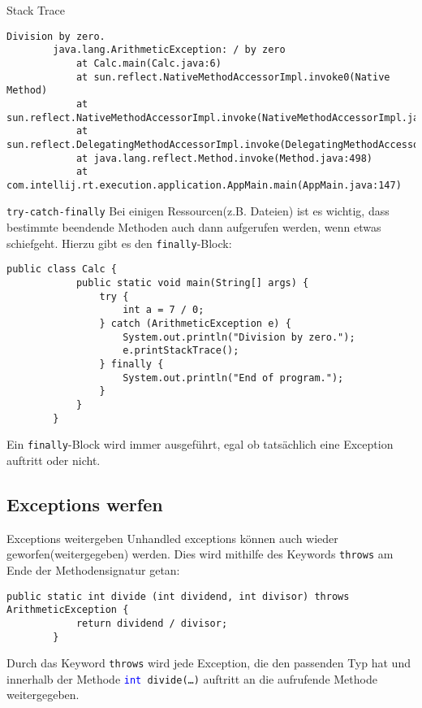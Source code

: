 \begin{frame}[fragile]{Stack Trace}
    \begin{lstlisting}[gobble=8]
        Division by zero.
        java.lang.ArithmeticException: / by zero
            at Calc.main(Calc.java:6)
            at sun.reflect.NativeMethodAccessorImpl.invoke0(Native Method)
            at sun.reflect.NativeMethodAccessorImpl.invoke(NativeMethodAccessorImpl.java:62)
            at sun.reflect.DelegatingMethodAccessorImpl.invoke(DelegatingMethodAccessorImpl.java:43)
            at java.lang.reflect.Method.invoke(Method.java:498)
            at com.intellij.rt.execution.application.AppMain.main(AppMain.java:147)
    \end{lstlisting}
\end{frame}

\begin{frame}[fragile]{\texttt{try-catch-finally}}
    Bei einigen Ressourcen(z.B. Dateien) ist es wichtig, dass bestimmte beendende Methoden auch dann aufgerufen werden, wenn etwas schiefgeht.
    Hierzu gibt es den \texttt{finally}-Block:
    \begin{lstlisting}[gobble=8]
        public class Calc {
            public static void main(String[] args) {
                try {
                    int a = 7 / 0;
                } catch (ArithmeticException e) {
                    System.out.println("Division by zero.");
                    e.printStackTrace();
                } finally {
                    System.out.println("End of program.");
                }
            }
        }
    \end{lstlisting}
    Ein \texttt{finally}-Block wird immer ausgeführt, egal ob tatsächlich eine Exception auftritt oder nicht.
\end{frame}

\subsection{Exceptions werfen}
\begin{frame}[fragile]{Exceptions weitergeben}
    Unhandled exceptions können auch wieder geworfen(weitergegeben) werden.
    Dies wird mithilfe des Keywords \texttt{throws} am Ende der Methodensignatur getan:
    \begin{lstlisting}[gobble=8]
        public static int divide (int dividend, int divisor) throws ArithmeticException {
            return dividend / divisor;
        }
    \end{lstlisting}
    Durch das Keyword \texttt{throws} wird jede Exception, die den passenden Typ hat und
    innerhalb der Methode \texttt{\textcolor{blue}{int} divide(\dots)} auftritt an die aufrufende Methode weitergegeben.
\end{frame}

